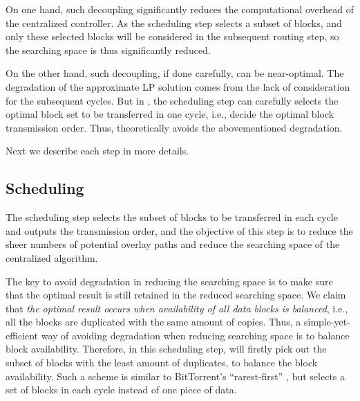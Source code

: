 On one hand, such decoupling significantly reduces the computational overhead of the centralized controller. As the scheduling step selects a subset of blocks, and only these selected blocks will be considered in the subsequent routing step, so the searching space is thus significantly reduced.

On the other hand, such decoupling, if done carefully, can be near-optimal. The degradation of the approximate LP solution comes from the lack of consideration for the subsequent cycles. But in \name, the scheduling step can carefully selects the optimal block set to be transferred in one cycle, i.e., decide the optimal block transmission order. Thus, \name theoretically avoids the abovementioned degradation.

Next we describe each step in more details.



\subsection{Scheduling}
\label{subsec:logic:scheduling}

The scheduling step
selects the subset of blocks to be transferred in each cycle and
outputs the transmission order, and the objective of this step is to reduce the sheer numbers of potential overlay paths and reduce the searching space of the centralized algorithm.


The key to avoid degradation in reducing the searching space is to make sure that the optimal result is still retained in the reduced searching space. We claim that {\em the optimal result occurs when availability of all data blocks is balanced}, i.e., all the blocks are duplicated with the same amount of copies. Thus, a simple-yet-efficient way of avoiding degradation when reducing searching space is to balance block availability. Therefore, in this scheduling step, \name will firstly pick out the subset of blocks with the least amount of duplicates, to balance the block availability. Such a scheme is similar to BitTorrent's ``rarest-first'' \cite{Cohen2003Incentives}, but \name selects a set of blocks in each cycle instead of one piece of data.


